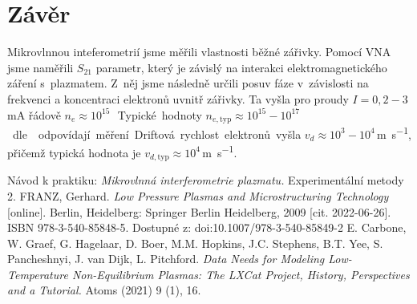 \documentclass[a4paper,12pt]{article}
\begin{document}
\section{Závěr}
\par Mikrovlnnou inteferometrií jsme měřili vlastnosti běžné zářivky. Pomocí 
VNA jsme na\-mě\-ři\-li $S_{21}$ parametr, který je závislý na interakci 
elektromagnetického záření s~plazmatem. Z~něj jsme následně určili posuv 
fáze v~závislosti na frekvenci a koncentraci elektronů uvnitř zářivky. Ta 
vyšla pro proudy $I=0,2\!-\!3$\,\si{\milli\ampere} řádově $n_e \approx 
10^{15}$\,\si{\cubic\per\meter}. Typické 
hodnoty $n_{e,\text{typ}}\approx10^{15}\!-\!10^{17}$\,\si{\cubic\per\meter} 
dle 
\cite{conc} odpovídají měření. Driftová rychlost elektronů vyšla 
$v_{d}\approx10^3\!-\!10^4$\,\si{\meter\per\second}, přičemž typická hodnota 
\cite{lxcat} je 
$v_{d,\text{typ}} \approx 
10^4$\,\si{\meter\per\second}.

\begin{thebibliography}{10}
	Návod k praktiku: \textit{Mikrovlnná interferometrie plazmatu.} 
	Experimentální metody 2.
	FRANZ, Gerhard. \textit{Low Pressure Plasmas and Microstructuring 
	Technology} 
	[online]. Berlin, Heidelberg: Springer Berlin Heidelberg, 2009 [cit. 
	2022-06-26]. ISBN 978-3-540-85848-5. Dostupné z: 
	doi:10.1007/978-3-540-85849-2
	E. Carbone, W. Graef, G. Hagelaar, D. Boer, M.M. Hopkins, J.C. Stephens, 
	B.T. Yee, S. Pancheshnyi, J. van Dijk, L. Pitchford. \textit{Data Needs for 
	Modeling Low-Temperature Non-Equilibrium Plasmas: The LXCat Project, 
	History, Perspectives and a Tutorial.} Atoms (2021) 9 (1), 16.
\end{thebibliography}
\end{document}
